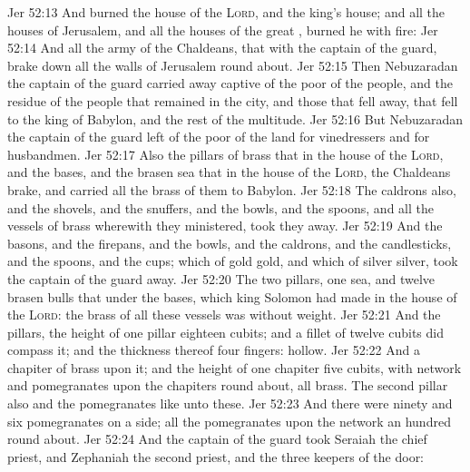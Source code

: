 \vs Jer 52:13 And burned the house of the \textsc{Lord}, and the king's house; and all the houses of Jerusalem, and all the houses of the great , burned he with fire:
\vs Jer 52:14 And all the army of the Chaldeans, that  with the captain of the guard, brake down all the walls of Jerusalem round about.
\vs Jer 52:15 Then Nebuzaradan the captain of the guard carried away captive  of the poor of the people, and the residue of the people that remained in the city, and those that fell away, that fell to the king of Babylon, and the rest of the multitude.
\vs Jer 52:16 But Nebuzaradan the captain of the guard left  of the poor of the land for vinedressers and for husbandmen.
\vs Jer 52:17 Also the pillars of brass that  in the house of the \textsc{Lord}, and the bases, and the brasen sea that  in the house of the \textsc{Lord}, the Chaldeans brake, and carried all the brass of them to Babylon.
\vs Jer 52:18 The caldrons also, and the shovels, and the snuffers, and the bowls, and the spoons, and all the vessels of brass wherewith they ministered, took they away.
\vs Jer 52:19 And the basons, and the firepans, and the bowls, and the caldrons, and the candlesticks, and the spoons, and the cups;  which  of gold  gold, and  which  of silver  silver, took the captain of the guard away.
\vs Jer 52:20 The two pillars, one sea, and twelve brasen bulls that  under the bases, which king Solomon had made in the house of the \textsc{Lord}: the brass of all these vessels was without weight.
\vs Jer 52:21 And  the pillars, the height of one pillar  eighteen cubits; and a fillet of twelve cubits did compass it; and the thickness thereof  four fingers:  hollow.
\vs Jer 52:22 And a chapiter of brass  upon it; and the height of one chapiter  five cubits, with network and pomegranates upon the chapiters round about, all  brass. The second pillar also and the pomegranates  like unto these.
\vs Jer 52:23 And there were ninety and six pomegranates on a side;  all the pomegranates upon the network  an hundred round about.
\vs Jer 52:24 And the captain of the guard took Seraiah the chief priest, and Zephaniah the second priest, and the three keepers of the door:
